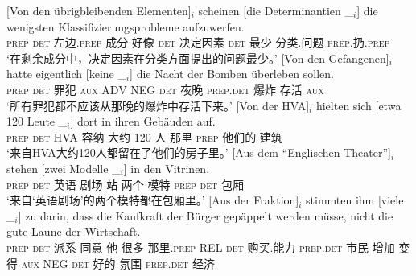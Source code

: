 \begin{sloppypar}
\eal
\ex 
\gll {}[Von den übrigbleibenden Elementen]$_i$ scheinen [die Determinantien \_$_i$] die wenigsten Klassifizierungsprobleme aufzuwerfen.\footnotemark\\
     \spacebr{}\textsc{prep} \textsc{det} 左边.\textsc{prep} 成分 好像 \spacebr{}\textsc{det} 决定因素 {} \textsc{det} 最少 分类.问题 \textsc{prep}.扔.\textsc{prep}\\
\glt `在剩余成分中，决定因素在分类方面提出的问题最少。'
\ex\label{bsp-von-den-gefangenen} 
\gll {}[Von den Gefangenen]$_i$ hatte eigentlich [keine \_$_i$] die Nacht der Bomben überleben sollen.\footnotemark\\
	 {}\spacebr{}\textsc{prep} \textsc{det} 罪犯 \textsc{aux} ADV \spacebr{}NEG {} \textsc{det} 夜晚 \textsc{prep}.\textsc{det} 爆炸 存活 \textsc{aux}\\
\glt `所有罪犯都不应该从那晚的爆炸中存活下来。'
\ex 
\gll {}[Von der HVA]$_i$ hielten sich [etwa 120 Leute \_$_i$] dort in ihren Gebäuden auf.\footnotemark\\
	 {}\spacebr{}\textsc{prep} \textsc{det} HVA 容纳  \spacebr{}大约 120 人 {} 那里 \textsc{prep} 他们的 建筑 \prt{}\\
\glt `来自HVA大约120人都留在了他们的房子里。'
\ex 
\gll {}[Aus dem "`Englischen Theater"']$_i$ stehen [zwei Modelle \_$_i$] in den Vitrinen.\footnotemark\hspace{-3pt}\\
	 {}\spacebr{}\textsc{prep} \textsc{det} 英语 剧场 站 \spacebr{}两个 模特 {} \textsc{prep} \textsc{det} 包厢\\
\glt `来自`英语剧场'的两个模特都在包厢里。'
\ex 
\gll {}[Aus der Fraktion]$_i$ stimmten ihm [viele \_$_i$] zu darin, dass die Kaufkraft der Bürger gepäppelt werden müsse, nicht die gute Laune der Wirtschaft.\footnotemark\\
	 {}\spacebr{}\textsc{prep} \textsc{det} 派系 同意 他 \spacebr{}很多 {} \prt{} 那里.\textsc{prep} REL \textsc{det} 购买.能力 \textsc{prep}.\textsc{det} 市民 增加 变得 \textsc{aux} NEG \textsc{det} 好的 氛围 \textsc{prep}.\textsc{det} 经济\\

\end{sloppypar}
